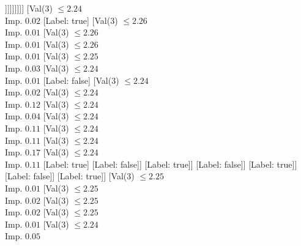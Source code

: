 \documentclass[margin=10pt]{standalone}
\begin{document}
\begin{forest}
																			[Label: false]
																			[Val($3$) $ \leq 2.23$ \\ Imp. $0.14$
																				[Label: true]
																				[Val($3$) $ \leq 2.23$ \\ Imp. $0.02$
																					[Label: false]
																					[Val($3$) $ \leq 2.23$ \\ Imp. $0.32$
																						[Label: true]
																						[Label: false]]]]]]]]]
														[Val($3$) $ \leq 2.24$ \\ Imp. $0.02$
															[Label: true]
															[Val($3$) $ \leq 2.26$ \\ Imp. $0.01$
																[Val($3$) $ \leq 2.26$ \\ Imp. $0.01$
																	[Val($3$) $ \leq 2.26$ \\ Imp. $0.01$
																		[Val($3$) $ \leq 2.25$ \\ Imp. $0.03$
																			[Val($3$) $ \leq 2.24$ \\ Imp. $0.01$
																				[Label: false]
																				[Val($3$) $ \leq 2.24$ \\ Imp. $0.02$
																					[Val($3$) $ \leq 2.24$ \\ Imp. $0.12$
																						[Val($3$) $ \leq 2.24$ \\ Imp. $0.04$
																							[Val($3$) $ \leq 2.24$ \\ Imp. $0.11$
																								[Val($3$) $ \leq 2.24$ \\ Imp. $0.11$
																									[Val($3$) $ \leq 2.24$ \\ Imp. $0.17$
																										[Val($3$) $ \leq 2.24$ \\ Imp. $0.11$
																											[Label: true]
																											[Label: false]]
																										[Label: true]]
																									[Label: false]]
																								[Label: true]]
																							[Label: false]]
																						[Label: true]]
																					[Val($3$) $ \leq 2.25$ \\ Imp. $0.01$
																						[Val($3$) $ \leq 2.25$ \\ Imp. $0.02$
																							[Val($3$) $ \leq 2.25$ \\ Imp. $0.02$
																								[Val($3$) $ \leq 2.25$ \\ Imp. $0.01$
																									[Val($3$) $ \leq 2.24$ \\ Imp. $0.05$

\end{forest}
\end{document}
